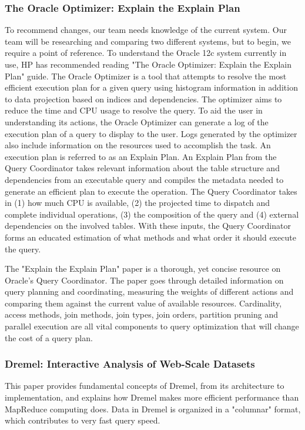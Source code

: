 \documentclass[onecolumn, draftclsnofoot,10pt, compsoc]{IEEEtran}
\begin{document}
\subsubsection{The Oracle Optimizer: Explain the Explain Plan}
To recommend changes, our team needs knowledge of the current system. 
Our team will be researching and comparing two different systems, but to begin, we require a point of reference.
To understand the Oracle 12c system currently in use, HP has recommended reading  "The Oracle Optimizer: Explain the Explain Plan" guide.
The Oracle Optimizer is a tool that attempts to resolve the most efficient execution plan for a given query using histogram information in addition to data projection based on indices and dependencies.
The optimizer aims to reduce the time and CPU usage to resolve the query.
To aid the user in understanding its actions, the Oracle Optimizer can generate a log of the execution plan of a query  to display to the user.
Logs generated by the optimizer also include information on the resources used to accomplish the task.
An execution plan is referred to as an Explain Plan. 
An Explain Plan from the Query Coordinator takes relevant information about the table structure and dependencies from an executable query and compiles the metadata needed to generate an efficient plan to execute the operation.
The Query Coordinator takes in (1) how much CPU is available, (2) the projected time to dispatch and complete individual operations, (3) the composition of the query and (4) external dependencies on the involved tables.
With these inputs, the Query Coordinator forms an educated estimation of what methods and what order it should execute the query.

The "Explain the Explain Plan" paper is a thorough, yet concise resource on Oracle's Query Coordinator.
The paper goes through detailed information on query planning and coordinating, measuring the weights of different actions and comparing them against the current value of available resources.
Cardinality, access methods, join methods, join types, join orders, partition pruning and parallel execution are all vital components to query optimization that will change the cost of a query plan.  

\subsubsection{Dremel: Interactive Analysis of Web-Scale Datasets}

This paper provides fundamental concepts of Dremel, from its architecture to implementation, and explains how Dremel makes more efficient performance than MapReduce computing does.
Data in Dremel is organized in a "columnar" format, which contributes to very fast query speed.
\end{document}
